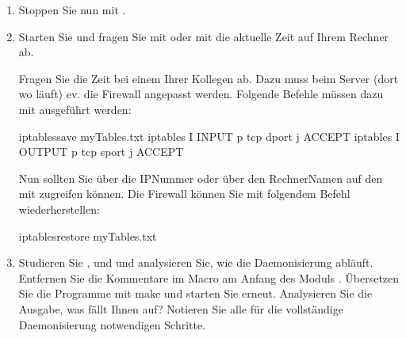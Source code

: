 \documentclass[a4paper,10pt,english]{report}
\begin{document}
\begin{enumerate}
\begin{sphinxVerbatim}[commandchars=\\\{\}]
\end{sphinxVerbatim}

\item {} 
\sphinxAtStartPar
Stoppen Sie nun  mit .

\item {} 
\sphinxAtStartPar
Starten Sie  und fragen Sie mit  oder mit  die aktuelle Zeit auf Ihrem Rechner ab.

\sphinxAtStartPar
{}
Fragen Sie die Zeit bei einem Ihrer Kollegen ab. Dazu muss beim Server (dort wo  läuft) ev. die Firewall angepasst werden. Folgende Befehle müssen dazu mit  ausgeführt werden:

\begin{sphinxVerbatim}[commandchars=\\\{\}]
iptables\PYGZhy{}save \PYGZgt{} myTables.txt 
iptables \PYGZhy{}I INPUT  \PYGZhy{}p tcp \PYGZhy{}\PYGZhy{}dport  \PYGZhy{}j ACCEPT
iptables \PYGZhy{}I OUTPUT  \PYGZhy{}p tcp \PYGZhy{}\PYGZhy{}sport  \PYGZhy{}j ACCEPT
\end{sphinxVerbatim}

\sphinxAtStartPar
Nun sollten Sie über die IP\sphinxhyphen{}Nummer oder über den Rechner\sphinxhyphen{}Namen auf den  mit  zugreifen können.
Die Firewall können Sie mit folgendem Befehl wiederherstellen:

\begin{sphinxVerbatim}[commandchars=\\\{\}]
iptables\PYGZhy{}restore myTables.txt
\end{sphinxVerbatim}

\item {} 
\sphinxAtStartPar
Studieren Sie ,  und  und analysieren Sie, wie die Daemonisierung abläuft. Entfernen Sie die Kommentare im Macro  am Anfang des Moduls . Übersetzen Sie die Programme mit make und starten Sie  erneut. Analysieren Sie die Ausgabe, was fällt Ihnen auf? Notieren Sie alle für die vollständige Daemonisierung notwendigen Schritte.


\end{enumerate}
\end{document}
